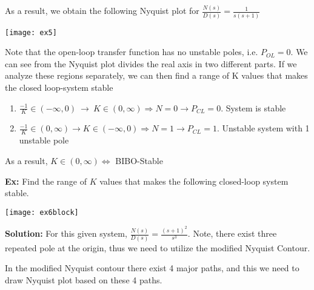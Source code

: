 \documentclass[twoside]{article}
\begin{document}
As a result, we obtain the following Nyquist plot for
$\frac{N(s)}{D(s)} = \frac{1}{s (s+1)}$

\vspace{6 pt}

  \begin{minipage}[h]{1\linewidth}
    \begin{center}
      \texttt{[image: ex5]}
    \end{center}
  \end{minipage}

\vspace{6 pt}

Note that the open-loop transfer function has no unstable poles,
i.e. $P_{OL} = 0$. 
We can see from the Nyquist plot divides the real axis in
two different parts. If we analyze  these regions separately, we can 
then find a range of K values that makes the closed loop-system stable
%
\begin{enumerate}
  \item $\frac{-1}{K} \in (-\infty , 0) \ \rightarrow \ K \in (0 , \infty) 
    \Rightarrow N = 0 \rightarrow P_{CL} = 0 $. System is stable 
  \item $\frac{-1}{K} \in (0, \infty) \rightarrow K \in (-\infty , 0)    
    \Rightarrow N = 1 \rightarrow P_{CL} = 1 $. Unstable system with 1
    unstable pole
\end{enumerate}
%
As a result, $K \in (0 , \infty) \Leftrightarrow $ BIBO-Stable

\newpage

\textbf{Ex:} Find the range of $K$ values that makes the
following closed-loop system stable. 

\vspace{6 pt}

  \begin{minipage}[h]{1\linewidth}
    \begin{center}
      \texttt{[image: ex6block]}
    \end{center}
  \end{minipage}

\vspace{6 pt}

\textbf{Solution:} For this given system, $\frac{N(s)}{D(s)} =
\frac{(s+1)^2}{s^3}$. Note, there exist three repeated pole at the origin, thus 
we need to utilize the modified Nyquist Contour. 

In the modified Nyquist contour there exist 4 major paths, 
and this we need to draw Nyquist plot based on these 4 paths. 
\end{document}
